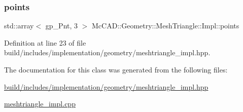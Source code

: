 \subsubsection{\texorpdfstring{points}{points}}
{\footnotesize\ttfamily std\+::array$<$ gp\+\_\+\+Pnt, 3 $>$ Mc\+C\+A\+D\+::\+Geometry\+::\+Mesh\+Triangle\+::\+Impl\+::points}



Definition at line 23 of file build/includes/implementation/geometry/meshtriangle\+\_\+impl.\+hpp.



The documentation for this class was generated from the following files\+:\begin{DoxyCompactItemize}
\item 
\hyperlink{build_2includes_2implementation_2geometry_2meshtriangle__impl_8hpp}{build/includes/implementation/geometry/meshtriangle\+\_\+impl.\+hpp}\item 
\hyperlink{meshtriangle__impl_8cpp}{meshtriangle\+\_\+impl.\+cpp}\end{DoxyCompactItemize}
